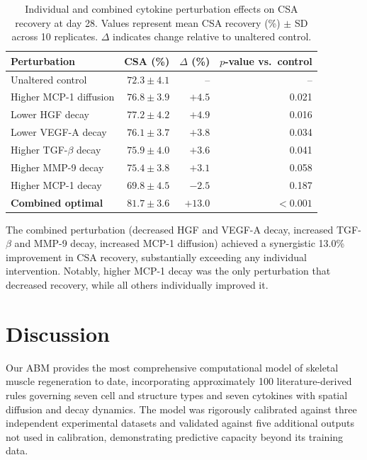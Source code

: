 \documentclass[11pt]{article}
\begin{document}
\begin{table}[H]
\centering
\caption{Individual and combined cytokine perturbation effects on CSA recovery at day 28. Values represent mean CSA recovery (\%) $\pm$ SD across 10 replicates. $\Delta$ indicates change relative to unaltered control.}
\label{tab:combined}
\begin{tabular}{lrrr}
\toprule
\textbf{Perturbation} & \textbf{CSA (\%)} & \textbf{$\Delta$ (\%)} & \textbf{$p$-value vs.\ control} \\
\midrule
Unaltered control & $72.3 \pm 4.1$ & -- & -- \\
Higher MCP-1 diffusion & $76.8 \pm 3.9$ & $+4.5$ & 0.021 \\
Lower HGF decay & $77.2 \pm 4.2$ & $+4.9$ & 0.016 \\
Lower VEGF-A decay & $76.1 \pm 3.7$ & $+3.8$ & 0.034 \\
Higher TGF-$\beta$ decay & $75.9 \pm 4.0$ & $+3.6$ & 0.041 \\
Higher MMP-9 decay & $75.4 \pm 3.8$ & $+3.1$ & 0.058 \\
Higher MCP-1 decay & $69.8 \pm 4.5$ & $-2.5$ & 0.187 \\
\textbf{Combined optimal} & $\mathbf{81.7 \pm 3.6}$ & $\mathbf{+13.0}$ & $\mathbf{<0.001}$ \\
\bottomrule
\end{tabular}
\end{table}

The combined perturbation (decreased HGF and VEGF-A decay, increased TGF-$\beta$ and MMP-9 decay, increased MCP-1 diffusion) achieved a synergistic 13.0\% improvement in CSA recovery, substantially exceeding any individual intervention. Notably, higher MCP-1 decay was the only perturbation that decreased recovery, while all others individually improved it.

\section{Discussion}

Our ABM provides the most comprehensive computational model of skeletal muscle regeneration to date, incorporating approximately 100 literature-derived rules governing seven cell and structure types and seven cytokines with spatial diffusion and decay dynamics. The model was rigorously calibrated against three independent experimental datasets and validated against five additional outputs not used in calibration, demonstrating predictive capacity beyond its training data.
\end{document}
